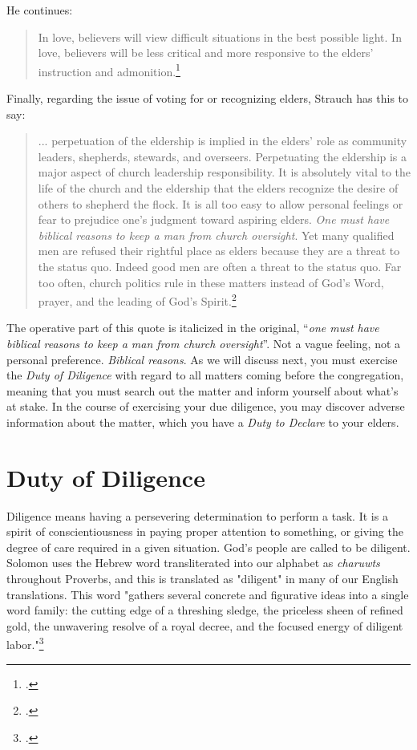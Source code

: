 \noindent
He continues:
\begin{quote}
In love, believers will view difficult situations in the best possible light.  In love, believers will be less critical and more responsive to the elders' instruction and admonition.\footcite{strauch2024esteem}
\end{quote}

\noindent
Finally, regarding the issue of voting for or recognizing elders, Strauch has this to say:
\begin{quote}
... perpetuation of the eldership is implied in the elders' role as community leaders, shepherds, stewards, and overseers.  Perpetuating the eldership is a major aspect of church leadership responsibility.  It is absolutely vital to the life of the church and the eldership that the elders recognize the desire of others to shepherd the flock.  It is all too easy to allow personal feelings or fear to prejudice one's judgment toward aspiring elders.  \textit{One must have biblical reasons to keep a man from church oversight}.  Yet many qualified men are refused their rightful place as elders because they are a threat to the status quo.  Indeed good men are often a threat to the status quo.  Far too often, church politics rule in these matters instead of God's Word, prayer, and the leading of God's Spirit.\footcite[p. 75]{strauch2000recovering}
\end{quote}

\noindent
The operative part of this quote is italicized in the original, ``\textit{one must have biblical reasons to keep a man from church oversight}''.  Not a vague feeling, not a personal preference.  \textit{Biblical reasons}.  As we will discuss next, you must exercise the \textit{Duty of Diligence} with regard to all matters coming before the congregation, meaning that you must search out the matter and inform yourself about what's at stake.  In the course of exercising your due diligence, you may discover adverse information about the matter, which you have a \textit{Duty to Declare} to your elders.

\ifdefined\embedversion\newpage\fi
\section{Duty of Diligence}
Diligence means having a persevering determination to perform a task.  It is a spirit of conscientiousness in paying proper attention to something, or giving the degree of care required in a given situation.  God's people are called to be diligent.  Solomon uses the Hebrew word transliterated into our alphabet as \textit{charuwts} throughout Proverbs, and this is translated as "diligent" in many of our English translations.  This word "gathers several concrete and figurative ideas into a single word family: the cutting edge of a threshing sledge, the priceless sheen of refined gold, the unwavering resolve of a royal decree, and the focused energy of diligent labor."\footcite{biblehub2742}  

